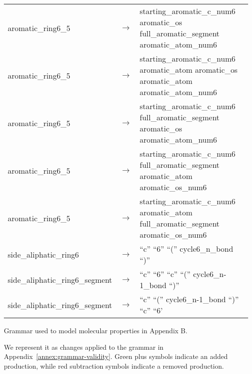 \begin{longtable}{m{} p{} p{}}
    aromatic\_ring6\_5 & $\rightarrow$ & starting\_aromatic\_c\_num6 aromatic\_os full\_aromatic\_segment aromatic\_atom\_num6 \\
    aromatic\_ring6\_5 & $\rightarrow$ & starting\_aromatic\_c\_num6 aromatic\_atom aromatic\_os aromatic\_atom aromatic\_atom\_num6 \\
    aromatic\_ring6\_5 & $\rightarrow$ & starting\_aromatic\_c\_num6 full\_aromatic\_segment aromatic\_os aromatic\_atom\_num6 \\
    aromatic\_ring6\_5 & $\rightarrow$ & starting\_aromatic\_c\_num6 full\_aromatic\_segment aromatic\_atom aromatic\_os\_num6 \\
    aromatic\_ring6\_5 & $\rightarrow$ & starting\_aromatic\_c\_num6 aromatic\_atom full\_aromatic\_segment aromatic\_os\_num6 \\
    side\_aliphatic\_ring6 & $\rightarrow$ & ``c'' ``6'' ``('' cycle6\_n\_bond ``)'' \\
    side\_aliphatic\_ring6\_segment & $\rightarrow$ & ``c'' ``6'' ``c'' ``('' cycle6\_n-1\_bond ``)'' \\
    side\_aliphatic\_ring6\_segment & $\rightarrow$ & ``c'' ``('' cycle6\_n-1\_bond ``)'' ``c'' ``6'
\end{longtable}
\normalsize

\label{annex:grammar-lipinski}

Grammar used to model molecular properties in Appendix B\@.

We represent it as changes applied to the grammar in Appendix~\ref{annex:grammar-validity}.
Green plus symbols indicate an added production, while red subtraction symbols indicate a removed production.


